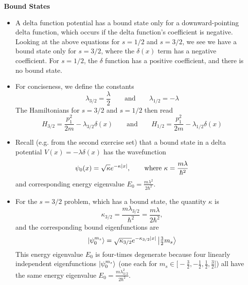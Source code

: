 \documentclass[11pt, a4paper]{article}
\newcommand{\eqtext}[1]{\qquad \text{#1} \qquad}
\newcommand{\Ham}{Hamiltonian\xspace}
\begin{document}
\textbf{Bound States}
\begin{itemize}	
	\item A delta function potential has a bound state only for a downward-pointing delta function, which occurs if the delta function's coefficient is negative. Looking at the above equations for $ s = 1/2$ and $ s = 3/2 $, we see we have a bound state only for $ s = 3/2 $, where the $ \delta(x) $ term has a negative coefficient. For $ s = 1/2 $, the $ \delta $ function has a positive coefficient, and there is no bound state.
	
	\item For conciseness, we define the constants 
	\begin{equation*}
		\lambda_{3/2} = \frac{\lambda}{2} \eqtext{and} \lambda_{1/2} = - \lambda
	\end{equation*}
	The \Ham{}s for $ s = 3/2 $ and $ s = 1/2 $ then read
	\begin{equation*}
		H_{3/2} = \frac{p_{1}^{2}}{2m} - \lambda_{3/2}\delta(x) \eqtext{and} H_{1/2} = \frac{p_{1}^{2}}{2m} - \lambda_{1/2}\delta(x)
	\end{equation*}
		
	\item Recall (e.g. from the second exercise set) that a bound state in a delta potential $ V(x) = - \lambda \delta(x) $ has the wavefunction
	\begin{equation*}
		 \psi_{0}(x) = \sqrt{\kappa} e^{-\kappa \abs{x}}, \qquad \text{where } \kappa = \frac{m\lambda}{\hbar^{2}}
	\end{equation*}
	and corresponding energy eigenvalue $  E_{0} = \frac{m\lambda^{2}}{2\hbar^{2}} $.
	
	
	\item For the $ s = 3/2 $ problem, which has a bound state, the quantity $ \kappa $ is
	\begin{equation*}
		\kappa_{3/2} = \frac{m\lambda_{3/2}}{\hbar^{2}} = \frac{m\lambda}{2\hbar^{2}},
	\end{equation*}
	and the corresponding bound eigenfunctions are
	\begin{equation*}
		\ket{\psi_{0}^{m_{s}}} = \sqrt{\kappa_{3/2}}e^{-\kappa_{3/2}\abs{x}} \ket{\tfrac{3}{2}m_{s}}
	\end{equation*}	
	This energy eigenvalue $ E_{0} $ is four-times degenerate because four linearly independent eigenfunctions $ \ket{\psi_{0}^{m_{s}}} $ (one each for $ m_{s} \in \big[-\frac{3}{2}, -\frac{1}{2}, \frac{1}{2}, \frac{3}{2}\big] $) all have the same energy eigenvalue $ E_{0} = \frac{m\lambda_{3/2}^{2}}{2\hbar^{2}} $. 
	

\end{itemize}
\end{document}
